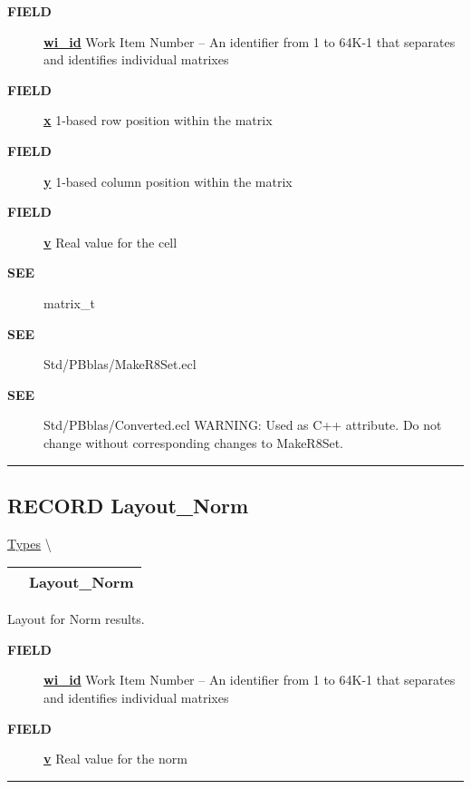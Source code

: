 \par
\begin{description}
\item [\colorbox{tagtype}{\color{white} \textbf{\textsf{FIELD}}}] \textbf{\underline{wi\_id}} Work Item Number -- An identifier from 1 to 64K-1 that separates and identifies individual matrixes
\item [\colorbox{tagtype}{\color{white} \textbf{\textsf{FIELD}}}] \textbf{\underline{x}} 1-based row position within the matrix
\item [\colorbox{tagtype}{\color{white} \textbf{\textsf{FIELD}}}] \textbf{\underline{y}} 1-based column position within the matrix
\item [\colorbox{tagtype}{\color{white} \textbf{\textsf{FIELD}}}] \textbf{\underline{v}} Real value for the cell
\item [\colorbox{tagtype}{\color{white} \textbf{\textsf{SEE}}}] \textbf{\underline{}} matrix\_t
\item [\colorbox{tagtype}{\color{white} \textbf{\textsf{SEE}}}] \textbf{\underline{}} Std/PBblas/MakeR8Set.ecl
\item [\colorbox{tagtype}{\color{white} \textbf{\textsf{SEE}}}] \textbf{\underline{}} Std/PBblas/Converted.ecl WARNING: Used as C++ attribute. Do not change without corresponding changes to MakeR8Set.
\end{description}

\rule{\linewidth}{0.5pt}
\subsection*{\textsf{\colorbox{headtoc}{\color{white} RECORD}
Layout\_Norm}}

\hypertarget{ecldoc:pbblas.types.layout_norm}{}
\hspace{0pt} \hyperlink{ecldoc:PBblas.Types}{Types} \textbackslash 

{\renewcommand{\arraystretch}{1.5}
\begin{tabularx}{\textwidth}{|>{\raggedright\arraybackslash}l|X|}
\hline
\hspace{0pt}\mytexttt{\color{red} } & \textbf{Layout\_Norm} \\
\hline
\end{tabularx}
}

\par
Layout for Norm results.

\par
\begin{description}
\item [\colorbox{tagtype}{\color{white} \textbf{\textsf{FIELD}}}] \textbf{\underline{wi\_id}} Work Item Number -- An identifier from 1 to 64K-1 that separates and identifies individual matrixes
\item [\colorbox{tagtype}{\color{white} \textbf{\textsf{FIELD}}}] \textbf{\underline{v}} Real value for the norm
\end{description}

\rule{\linewidth}{0.5pt}


